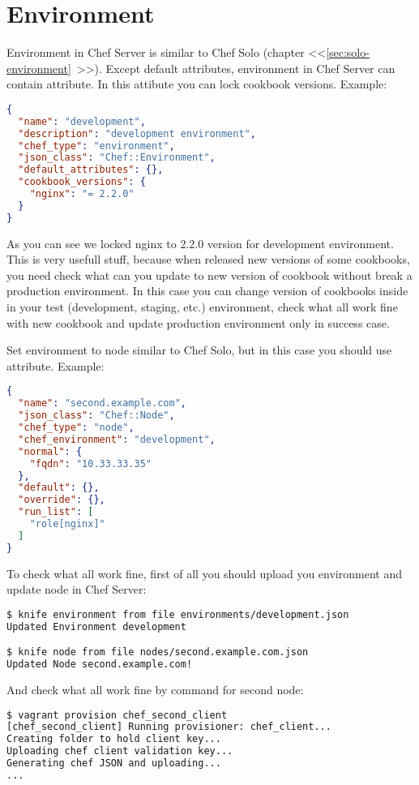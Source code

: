 \section{Environment}

Environment in Chef Server is similar to Chef Solo (chapter <<\ref{sec:solo-environment}~>>). Except default attributes, environment in Chef Server can contain  attribute. In this attibute you can lock cookbook versions. Example:

\begin{lstlisting}[language=JSON,label=lst:my-serer-cloud-environment1,title=my-server-cloud/environments/development.json]
{
  "name": "development",
  "description": "development environment",
  "chef_type": "environment",
  "json_class": "Chef::Environment",
  "default_attributes": {},
  "cookbook_versions": {
    "nginx": "= 2.2.0"
  }
}
\end{lstlisting}

As you can see we locked nginx to 2.2.0 version for development environment. This is very usefull stuff, because when released new versions of some cookbooks, you need check what can you update to new version of cookbook without break a production environment. In this case you can change version of cookbooks inside  in your test (development, staging, etc.) environment, check what all work fine with new cookbook and update production environment only in success case.

Set environment to node similar to Chef Solo, but in this case you should use  attribute. Example:

\begin{lstlisting}[language=JSON,label=lst:my-serer-cloud-environment2,title=my-server-cloud/nodes/second.example.com.json]
{
  "name": "second.example.com",
  "json_class": "Chef::Node",
  "chef_type": "node",
  "chef_environment": "development",
  "normal": {
    "fqdn": "10.33.33.35"
  },
  "default": {},
  "override": {},
  "run_list": [
    "role[nginx]"
  ]
}
\end{lstlisting}

To check what all work fine, first of all you should upload you environment and update node in Chef Server:

\begin{lstlisting}[language=Bash,label=lst:my-serer-cloud-environment3]
$ knife environment from file environments/development.json
Updated Environment development

$ knife node from file nodes/second.example.com.json
Updated Node second.example.com!
\end{lstlisting}

And check what all work fine by command  for second node:

\begin{lstlisting}[language=Bash,label=lst:my-serer-cloud-environment4]
$ vagrant provision chef_second_client
[chef_second_client] Running provisioner: chef_client...
Creating folder to hold client key...
Uploading chef client validation key...
Generating chef JSON and uploading...
...
\end{lstlisting}
